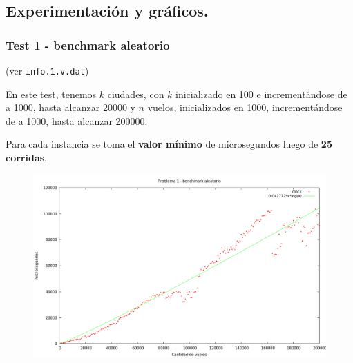 \subsection{Experimentación y gráficos.}

\vspace*{0.3cm}

\subsubsection{Test 1 - benchmark aleatorio}

(ver \verb|info.1.v.dat|) \medskip

En este test, tenemos $k$ ciudades, con $k$ inicializado en 100 e incrementándose de a 1000, hasta alcanzar 20000 y $n$ vuelos, inicializados en 1000, incrementándose de a 1000, hasta alcanzar 200000.

Para cada instancia se toma el \textbf{valor mínimo} de microsegundos luego de
\textbf{25 corridas}.

\vspace*{0.5cm}

\begin{figure}[h]
  \begin{center}
    \includegraphics[scale=0.35]{imagenes/grafico-1-v.png}
  \end{center}
\end{figure}

